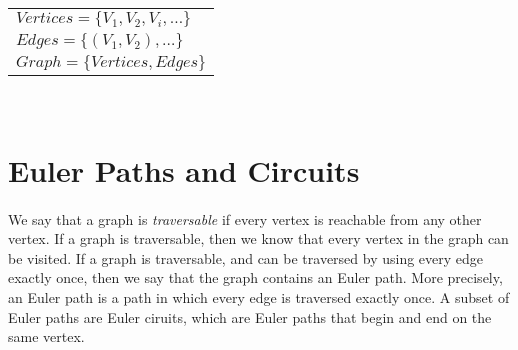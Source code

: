 \documentclass{article}
\begin{document}
\begin{center}
    \begin{tabular}{l}
        $Vertices = \{V_{1}, V_{2}, V_{i}, \dots\}$\\
        $Edges = \{(V_{1}, V_{2}), \dots\}$\\
        $Graph = \{Vertices, Edges\}$\\
    \end{tabular}\\
\end{center}



\paragraph{}



\section*{Euler Paths and Circuits}
\paragraph{}
We say that a graph is \textit{traversable} if every vertex is reachable from any other vertex. If a graph is traversable, then we know that every vertex in the graph can be visited. If a graph is traversable, and can be traversed by using every edge exactly once, then we say that the graph contains an Euler path. More precisely, an Euler path is a path in which every edge is traversed exactly once. A subset of Euler paths are Euler ciruits, which are Euler paths that begin and end on the same vertex.
\end{document}
